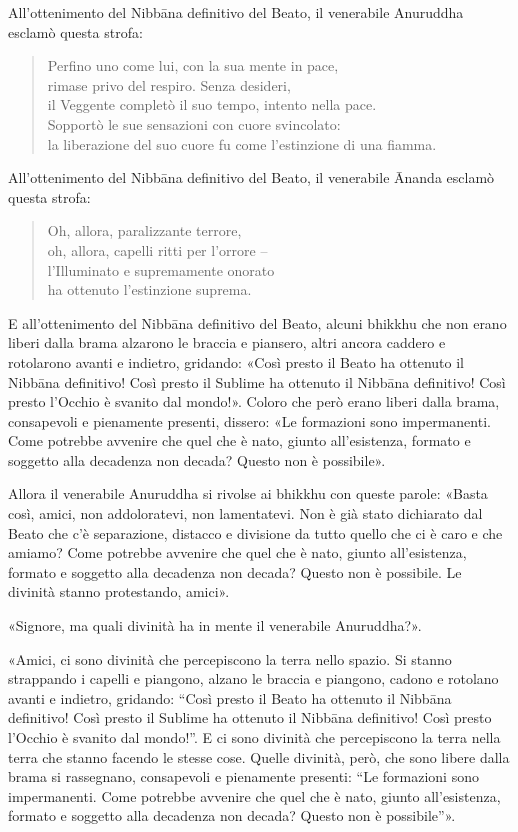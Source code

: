 All’ottenimento del Nibbāna definitivo del Beato, il venerabile Anuruddha
esclamò questa strofa:

\begin{quote}
Perfino uno come lui, con la sua mente in pace, \\
rimase privo del respiro. Senza desideri, \\
il Veggente completò il suo tempo, intento nella pace. \\
Sopportò le sue sensazioni con cuore svincolato: \\
la liberazione del suo cuore fu come l’estinzione di una fiamma.
\end{quote}

All’ottenimento del Nibbāna definitivo del Beato, il venerabile Ānanda esclamò
questa strofa:

\begin{quote}
Oh, allora, paralizzante terrore, \\
oh, allora, capelli ritti per l’orrore – \\
l’Illuminato e supremamente onorato \\
ha ottenuto l’estinzione suprema.
\end{quote}


E all’ottenimento del Nibbāna definitivo del Beato, alcuni bhikkhu che non erano
liberi dalla brama alzarono le braccia e piansero, altri ancora caddero e
rotolarono avanti e indietro, gridando: «Così presto il Beato ha ottenuto il
Nibbāna definitivo! Così presto il Sublime ha ottenuto il Nibbāna definitivo!
Così presto l’Occhio è svanito dal mondo!». Coloro che però erano liberi dalla
brama, consapevoli e pienamente presenti, dissero: «Le formazioni sono
impermanenti. Come potrebbe avvenire che quel che è nato, giunto all’esistenza,
formato e soggetto alla decadenza non decada? Questo non è possibile».

Allora il venerabile Anuruddha si rivolse ai bhikkhu con queste parole: «Basta
così, amici, non addoloratevi, non lamentatevi. Non è già stato dichiarato dal
Beato che c’è separazione, distacco e divisione da tutto quello che ci è caro e
che amiamo? Come potrebbe avvenire che quel che è nato, giunto all’esistenza,
formato e soggetto alla decadenza non decada? Questo non è possibile. Le
divinità stanno protestando, amici».

«Signore, ma quali divinità ha in mente il venerabile Anuruddha?».

«Amici, ci sono divinità che percepiscono la terra nello spazio. Si stanno
strappando i capelli e piangono, alzano le braccia e piangono, cadono e rotolano
avanti e indietro, gridando: “Così presto il Beato ha ottenuto il Nibbāna
definitivo! Così presto il Sublime ha ottenuto il Nibbāna definitivo! Così
presto l’Occhio è svanito dal mondo!”. E ci sono divinità che percepiscono la
terra nella terra che stanno facendo le stesse cose. Quelle divinità, però, che
sono libere dalla brama si rassegnano, consapevoli e pienamente presenti: “Le
formazioni sono impermanenti. Come potrebbe avvenire che quel che è nato, giunto
all’esistenza, formato e soggetto alla decadenza non decada? Questo non è
possibile”».

